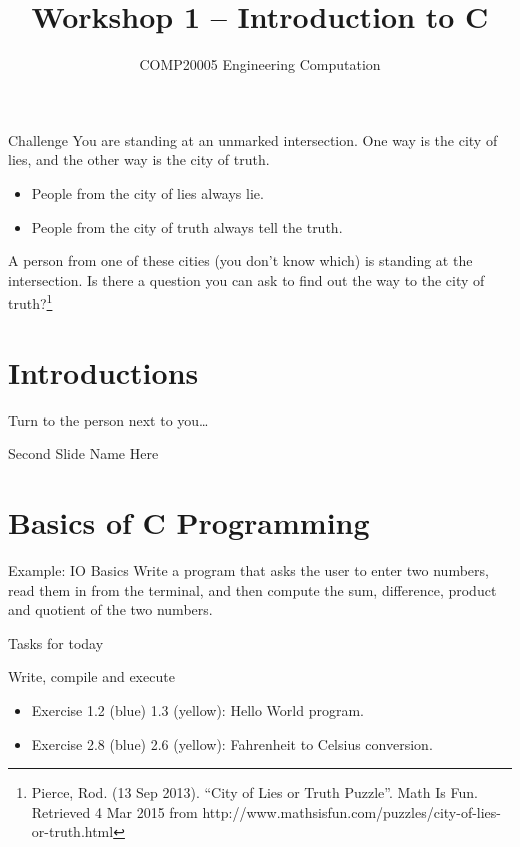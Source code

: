 \documentclass{beamer}
\title{Workshop 1 -- Introduction to C}
\author{COMP20005 Engineering Computation}
\institute{The University of Melbourne}
\begin{document}
\begin{frame}{Challenge}
    You are standing at an unmarked intersection. One way is the city of
    lies, and the other way is the city of truth.
    \begin{itemize}
        \item People from the city of lies always lie.
        \item People from the city of truth always tell the truth.
    \end{itemize}
    A person from one of these cities (you don't know which) is standing at
    the intersection. Is there a question you can ask to find out the way to
    the city of truth?\footnote{Pierce, Rod. (13 Sep 2013). ``City of Lies or Truth Puzzle''. Math Is Fun. Retrieved 4 Mar 2015 from http://www.mathsisfun.com/puzzles/city-of-lies-or-truth.html}
\end{frame}

\begin{frame}
    \titlepage
\end{frame}

\section{Introductions}

\begin{frame}{Turn to the person next to you\ldots}
\end{frame}

\begin{frame}{Second Slide Name Here}
\end{frame}

\section{Basics of C Programming}

\begin{frame}{Example: IO Basics}
    Write a program that asks the user to enter two numbers, read them in
    from the terminal, and then compute the sum, difference, product and
    quotient of the two numbers.
\end{frame}

\begin{frame}{Tasks for today}
    \begin{block}{Write, compile and execute}
        \begin{itemize}
            \item Exercise 1.2 (blue) 1.3 (yellow): Hello World program.
            \item Exercise 2.8 (blue) 2.6 (yellow): Fahrenheit to Celsius
                conversion.
        \end{itemize}
    \end{block}
\end{frame}
\end{document}
